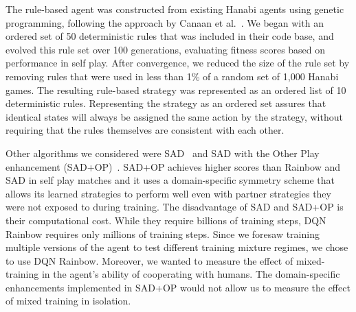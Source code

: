 \documentclass[letterpaper]{article} %
\begin{document}
The rule-based agent was constructed from existing Hanabi agents using genetic programming,  following the approach by  Canaan et al.~.  We began with an ordered  set of 50 deterministic rules   that was included in their code base,  and evolved  this rule set over 100 generations, evaluating fitness scores based on performance in self play.
After convergence, we reduced the size of the rule set  by  removing rules that were used in less than 1\% of a random set of 1,000 Hanabi games.  The resulting rule-based  strategy was represented as an  ordered list of 10 deterministic rules.  Representing the strategy as an ordered set assures  that identical states will always be assigned the same action by the strategy, without requiring that the rules themselves are consistent with each other.





Other algorithms we considered were SAD~\cite{SAD} and SAD with the Other Play enhancement (SAD+OP)~\cite{OP}. SAD+OP achieves higher scores than Rainbow and SAD in self play matches and it uses a domain-specific symmetry scheme that allows its learned strategies to perform well even with partner strategies they were not exposed to during training. The disadvantage of SAD and SAD+OP is their computational cost. While they require billions of training steps, DQN Rainbow requires only millions of training steps. Since we foresaw training multiple versions of the agent to test different training mixture regimes, we chose to use DQN Rainbow. Moreover, we wanted to measure the effect of mixed-training in the agent's ability of cooperating with humans. The domain-specific enhancements implemented in SAD+OP would not allow us to measure the effect of mixed training in isolation.


\end{document}
